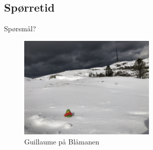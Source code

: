 \subsection*{Spørretid}
\begin{frame}{Spørsmål?}
    \begin{figure}
        \centering
        \includegraphics[height = 4.9cm]{images/guillaume7.jpg}
        \caption{Guillaume på Blåmanen}
        \label{fig:guillaume7a}
    \end{figure}
\end{frame}